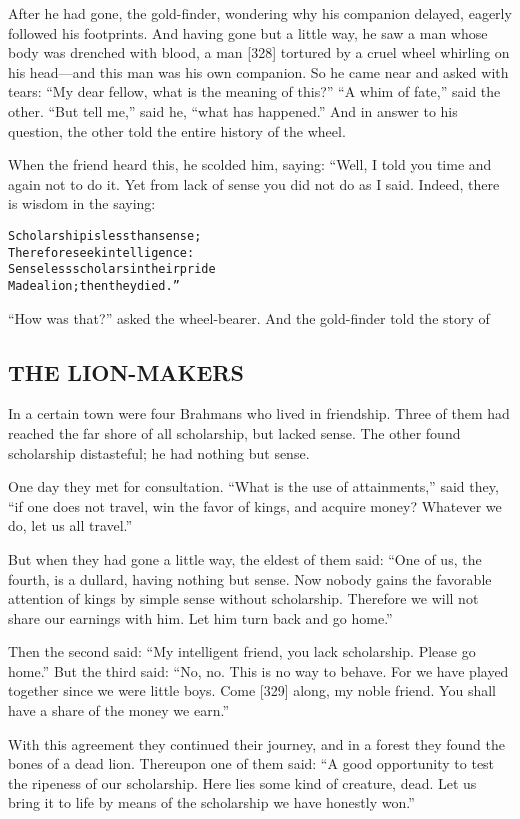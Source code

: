 \documentclass{article}
\renewenvironment{verbatim}{\begin{alltt}\normalfont\begin{centering}}{\end{centering}\end{alltt}}
\begin{document}
After he had gone, the gold-finder, wondering why his companion
delayed, eagerly followed his footprints. And having gone but a
little way, he saw a man whose body was drenched with blood, a man
[328] tortured by a cruel wheel whirling on his head---and this man
was his own companion. So he came near and asked with tears:
``My dear fellow, what is the meaning of this?''
``A whim of fate,'' said the other. ``But tell me,'' said he,
``what has happened.'' And in answer to his question, the other
told the entire history of the wheel.

When the friend heard this, he scolded him, saying: “Well, I told
you time and again not to do it. Yet from lack of sense you did not
do as I said. Indeed, there is wisdom in the saying:

\begin{verbatim}
Scholarship is less than sense;
Therefore seek intelligence:
Senseless scholars in their pride
Made a lion; then they died.”
\end{verbatim}
``How was that?'' asked the wheel-bearer. And the gold-finder told
the story of

\subsection{THE LION-MAKERS}

In a certain town were four Brahmans who lived in friendship. Three
of them had reached the far shore of all scholarship, but lacked
sense. The other found scholarship distasteful; he had nothing but
sense.

One day they met for consultation.
``What is the use of attainments,'' said they,
``if one does not travel, win the favor of kings, and acquire money? Whatever we do, let us all travel.''

But when they had gone a little way, the eldest of them said:
``One of us, the fourth, is a dullard, having nothing but sense. Now nobody gains the favorable attention of kings by simple sense without scholarship. Therefore we will not share our earnings with him. Let him turn back and go home.''

Then the second said:
``My intelligent friend, you lack scholarship. Please go home.''
But the third said:
``No, no. This is no way to behave. For we have played together since we were little boys. Come [329] along, my noble friend. You shall have a share of the money we earn.''

With this agreement they continued their journey, and in a forest
they found the bones of a dead lion. Thereupon one of them said:
``A good opportunity to test the ripeness of our scholarship. Here lies some kind of creature, dead. Let us bring it to life by means of the scholarship we have honestly won.''
\end{document}

